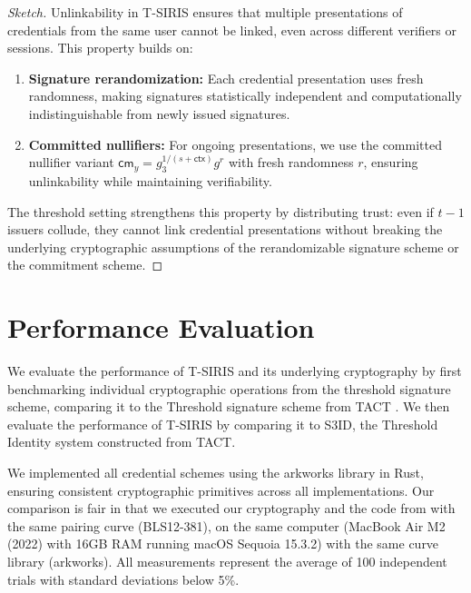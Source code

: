 \begin{proof}[Sketch]
Unlinkability in T-SIRIS ensures that multiple presentations of credentials from the same user cannot be linked, even across different verifiers or sessions. This property builds on:

\begin{enumerate}
    \item \textbf{Signature rerandomization:} Each credential presentation uses fresh randomness, making signatures statistically independent and computationally indistinguishable from newly issued signatures.
    
    \item \textbf{Committed nullifiers:} For ongoing presentations, we use the committed nullifier variant $\mathsf{cm}_y = g_3^{1/(s + \mathsf{ctx})} g^r$ with fresh randomness $r$, ensuring unlinkability while maintaining verifiability.
\end{enumerate}

The threshold setting strengthens this property by distributing trust: even if $t-1$ issuers collude, they cannot link credential presentations without breaking the underlying cryptographic assumptions of the rerandomizable signature scheme or the commitment scheme.
\end{proof}















\newpage
\section{Performance Evaluation}

We evaluate the performance of T-SIRIS and its underlying cryptography by first benchmarking individual cryptographic operations from the threshold signature scheme, comparing it to the Threshold signature scheme from TACT \cite{rabaninejad_attribute-based_2024}. We then evaluate the performance of T-SIRIS by comparing it to S3ID, the Threshold Identity system constructed from TACT.

We implemented all credential schemes using the arkworks library \cite{arkworks_contributors_arkworks_2022} in Rust, ensuring consistent cryptographic primitives across all implementations. Our comparison is fair in that we executed our cryptography \cite{polgar_anonymous_2025} and the code from \cite{arkworks_contributors_arkworks_2022} with the same pairing curve (BLS12-381), on the same computer (MacBook Air M2 (2022) with 16GB RAM running macOS Sequoia 15.3.2) with the same curve library (arkworks). All measurements represent the average of 100 independent trials with standard deviations below 5\%. 


